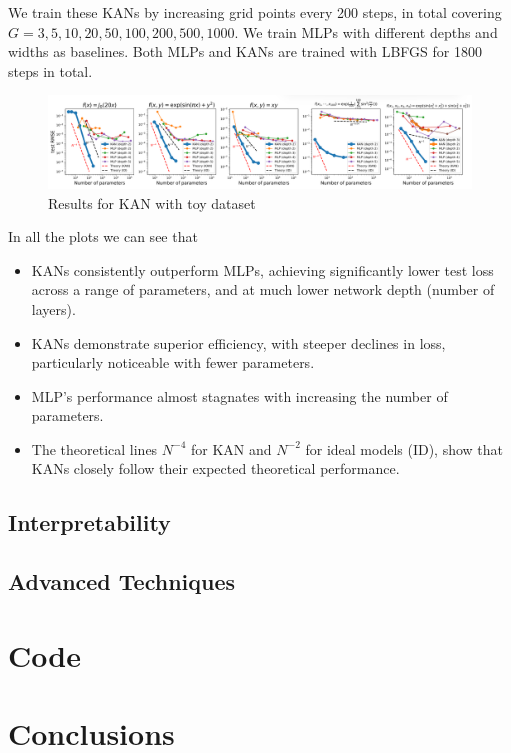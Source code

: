 \documentclass[12pt,a4paper]{article}
\begin{document}
We train these KANs by increasing grid points every 200 steps, in total covering $G =
{3, 5, 10, 20, 50, 100, 200, 500, 1000}$. We train MLPs with different depths and widths as baselines. Both MLPs and KANs are trained with LBFGS for 1800 steps in total.


\begin{figure}[H]
    \centering
    \includegraphics[width=0.9\linewidth]{Images/result.png}
    \caption{Results for KAN with toy dataset}
    \label{fig:re}
\end{figure}

In all the plots we can see that
\begin{itemize}
    \item KANs consistently outperform MLPs, achieving significantly lower test loss across a range of parameters, and at much lower network depth (number of layers).
    \item KANs demonstrate superior efficiency, with steeper declines in loss, particularly noticeable with fewer parameters.
    \item MLP's performance almost stagnates with increasing the number of parameters.
    \item The theoretical lines $N^{-4}$ for KAN and $N^{-2}$ for ideal models (ID), show that KANs closely follow their expected theoretical performance.
\end{itemize}

\subsection{Interpretability}
\subsection{Advanced Techniques}
\section{Code}
\section{Conclusions}


\end{document}
